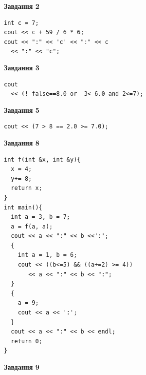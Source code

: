 \documentclass[12pt, ukrainian]{article}
\begin{document}
{\begin {large}
\begin{minipage}[t]{7.0cm}
\end{minipage}
\vline \hspace{1mm}
\begin{minipage}[t]{11.0cm}

\begin{center}
\textbf{Завдання 2}
\end{center}
\vspace{-8mm}

\begin{verbatim}
int c = 7;
cout << c + 59 / 6 * 6;
cout << ":" << 'c' << ":" << c 
  << ":" << "c";
\end{verbatim}



\begin{center}
\textbf{Завдання 3}
\end{center}
\vspace{-8mm}

\begin{verbatim}
cout 
  << (! false==8.0 or  3< 6.0 and 2<=7);
\end{verbatim}



\begin{center}
\textbf{Завдання 5}
\end{center}
\vspace{-8mm}

\begin{verbatim}
cout << (7 > 8 == 2.0 >= 7.0);
\end{verbatim}



\begin{center}
\textbf{Завдання 8}
\end{center}
\vspace{-8mm}

\begin{verbatim}
int f(int &x, int &y){
  x = 4;
  y+= 8;
  return x;
}
int main(){
  int a = 3, b = 7;
  a = f(a, a);
  cout << a << ":" << b <<':';
  {
    int a = 1, b = 6;
    cout << ((b<=5) && ((a+=2) >= 4))
       << a << ":" << b << ":";
  }
  {
    a = 9;
    cout << a << ':';
  }
  cout << a << ":" << b << endl;
  return 0;
}
\end{verbatim}

\end{minipage}


\begin{minipage}[t]{7.0cm}

\begin{center}
\textbf{Завдання 9}
\end{center}
\vspace{-8mm}


\end{minipage}
\end{large}}
\end{document}
